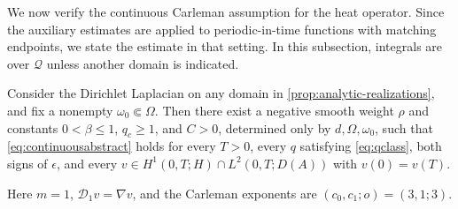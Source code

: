 \documentclass[print,wide,eng]{draft}
\begin{document}
We now verify the continuous Carleman assumption for the heat operator. Since the auxiliary estimates are applied to periodic-in-time functions with matching endpoints, we state the estimate in that setting. In this subsection, integrals are over $\mathcal Q$ unless another domain is indicated.
%
\begin{proposition}\label{prop:continuousCE}
Consider the Dirichlet Laplacian on any domain in \cref{prop:analytic-realizations}, and fix a nonempty \(\omega_0\Subset\Omega\). Then there exist a negative smooth weight \(\rho\) and constants \(0<\beta\le1\), \(q_c\ge1\), and \(C>0\), determined only by \(d,\Omega,\omega_0\), such that \cref{eq:continuousabstract} holds for every \(T>0\), every \(q\) satisfying \cref{eq:qclass}, both signs of \(\epsilon\), and every \(v\in H^1(0,T;H)\cap L^2(0,T;D(A))\) with \(v(0)=v(T)\).

Here $m=1$, $\mathcal D_1v=\nabla v$, and the Carleman exponents are $(c_0,c_1;o)=(3,1;3)$.
\end{proposition}
%
%
%
\end{document}
